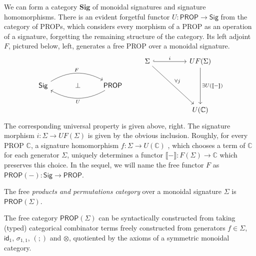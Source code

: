 We can form a category $\textbf{Sig}$ of monoidal signatures and signature homomorphisms.  There is an evident forgetful functor $U: \textsf{PROP} \to \textsf{Sig}$ from the category of PROPs, which considers every morphism of a PROP as an operation of a signature, forgetting the remaining structure of the category.   Its left adjoint $F$, pictured below, left,  generates a free PROP over a monoidal signature.
\[\begin{tikzcd}
	&&& \Sigma && {UF(\Sigma)} \\
	{\textsf{Sig}} & {\ \  \perp} & {\textsf{PROP}} \\
	&&&&& {U(\mathbb{C})}
	\arrow["F", bend left, from=2-1, to=2-3]
	\arrow["U", bend left, from=2-3, to=2-1]
	\arrow["i", hook, from=1-4, to=1-6]
	\arrow["{\forall j}", from=1-4, to=3-6]
	\arrow["{\exists U(\llbracket - \rrbracket)}", from=1-6, to=3-6]
\end{tikzcd}\]
The corresponding universal property is given above, right.  The signature morphism $i:\Sigma \to UF(\Sigma)$ is given by the obvious inclusion.  Roughly,  for every PROP $\mathbb{C}$, a signature homomorphism $f: \Sigma \to U(\mathbb{C})$ , which chooses a term of $\mathbb{C}$ for each generator $\Sigma$,  uniquely determines a functor $\llbracket - \rrbracket: F(\Sigma) \to \mathbb{C}$ which preserves this choice.  In the sequel, we will name the free functor $F$ as $\textsf{PROP}(-): \textsf{Sig} \to \textsf{PROP}$. 

\begin{definition}
The free \textit{products and permutations category} over a monoidal signature $\Sigma$ is $\textsf{PROP}(\Sigma)$.  
\end{definition}
The free category $\textsf{PROP}(\Sigma)$ can be syntactically constructed from taking (typed) categorical combinator terms freely constructed from generators $f \in \Sigma$, $\textsf{id}_1$, $\sigma_{1,1}$, $(;\!)$ and $\otimes$, quotiented by the axioms of a symmetric monoidal category.  

